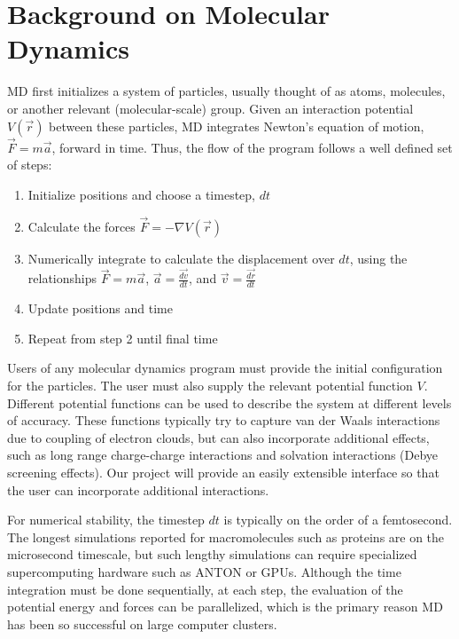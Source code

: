 \documentclass[10pt]{article}
\begin{document}
\section{Background on Molecular Dynamics}
MD first initializes a system of particles, usually thought of as atoms, molecules, or another relevant (molecular-scale) group.  
%
Given an interaction potential $V (\overrightarrow{r})$ between these particles, MD integrates Newton's equation of motion, $\overrightarrow{F}=m\overrightarrow{a}$, forward in time.  
%
Thus, the flow of the program follows a well defined set of steps:
\begin{enumerate}
    \item Initialize positions and choose a timestep, $dt$
    \item Calculate the forces $\overrightarrow{F} =  -\nabla V (\overrightarrow{r}) $
    \item Numerically integrate to calculate the displacement over $dt$, using the relationships $\overrightarrow{F}=m\overrightarrow{a}$, $\overrightarrow{a} = \frac{\overrightarrow{dv}}{dt}$, and $\overrightarrow{v} = \frac{\overrightarrow{dr}}{dt}$
    \item Update positions and time
    \item Repeat from step 2 until final time
\end{enumerate}

Users of any molecular dynamics program must provide the initial configuration for the particles.  
%
The user must also supply the relevant potential function $V$. Different potential functions can be used to describe the system at different levels of accuracy. 
%
These functions typically try to capture van der Waals interactions due to coupling of electron clouds, but can also incorporate additional effects, such as long range charge-charge interactions and solvation interactions (Debye screening effects). 
%
Our project will provide an easily extensible interface so that the user can incorporate additional interactions.

For numerical stability, the timestep $dt$ is typically on the order of a femtosecond. 
%
The longest simulations reported for macromolecules such as proteins are on the microsecond timescale, but such lengthy simulations can require specialized supercomputing hardware such as ANTON or GPUs. 
%
Although the time integration must be done sequentially, at each step, the evaluation of the potential energy and forces can be parallelized, which is the primary reason MD has been so successful on large computer clusters.
\end{document}
